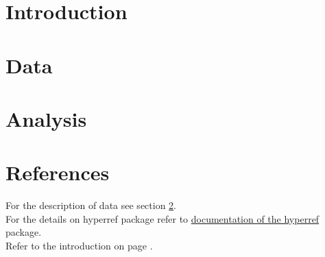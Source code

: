 \documentclass[12pt]{article}
\begin{document}
\section{Introduction}
\label{sec:introduction}
\blindtext
\section{Data}
\label{sec:data}
\blindtext
\section{Analysis}
\label{sec:analysis}
\blindtext
\section{References}
For the description of data see section \ref{sec:data}.\\
For the details on hyperref package refer to  \href{https://ctan.org/pkg/hyperref?lang=de}{documentation of the hyperref} package.\\
Refer to the introduction on page \pageref{sec:analysis}.
\end{document}
